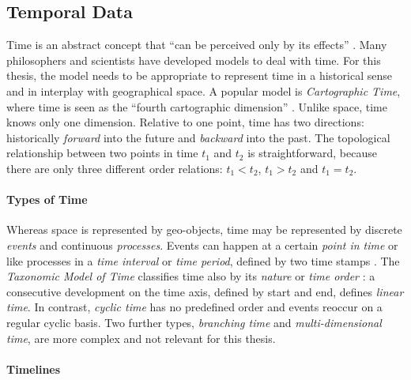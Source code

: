 
\subsection{Temporal Data} %
\label{sub:temporal_data}

Time is an abstract concept that ``can be perceived only by its effects''
\cite[p. 27]{Langran1989timeingis}.
Many philosophers and scientists have developed models to deal with time. For this thesis, the model needs to be appropriate to represent time in a historical sense and in interplay with geographical space. A popular model is \emph{Cartographic Time}, where time is seen as the ``fourth cartographic dimension''
\cite[p. 28]{Langran1989timeingis}.
Unlike space, time knows only one dimension. Relative to one point, time has two directions: historically \emph{forward} into the future and \emph{backward} into the past.
The topological relationship between two points in time $t_1$ and $t_2$ is straightforward, because there are only three different order relations: $t_1 < t_2$, $t_1 > t_2$ and $t_1 = t_2$.

\paragraph{Types of Time} %
\label{par:types_of_time}

Whereas space is represented by geo-objects, time may be represented by discrete \emph{events} and continuous \emph{processes}. Events can happen at a certain \emph{point in time} or like processes in a \emph{time interval} or \emph{time period}, defined by two time stamps
\cite[chapter 2, pp. 47-49]{solana2014spatio}.
The \emph{Taxonomic Model of Time} classifies time also by its \emph{nature} or \emph{time order}
\cite{frank98typesoftime}:
a consecutive development on the time axis, defined by start and end, defines \emph{linear time}. In contrast, \emph{cyclic time} has no predefined order and events reoccur on a regular cyclic basis. Two further types, \emph{branching time} and \emph{multi-dimensional time}, are more complex and not relevant for this thesis.



\paragraph{Timelines} %
\label{sub:timelines}

